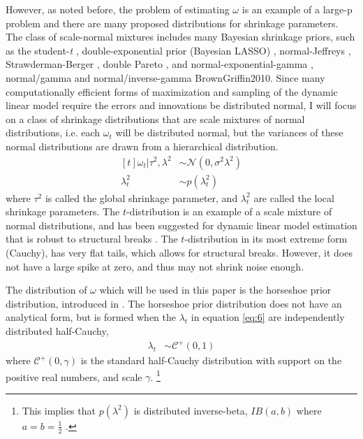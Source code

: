 \documentclass{article}
\newcommand{\paren}[1]{\ensuremath{\left(#1\right)}}
\newcommand{\dnorm}[1]{\ensuremath{\mathcal{N}\paren{#1}}}
\newcommand{\dhalfcauchy}[1]{\ensuremath{\mathcal{C}^{+}\paren{#1}}}
\begin{document}
However, as noted before, the problem of estimating $\omega$ is an example of a large-p problem and there are many proposed distributions for shrinkage parameters.
The class of scale-normal mixtures includes many Bayesian shrinkage priors, such as the student-\textit{t} \parencite{Tipping2001}, double-exponential prior (Bayesian LASSO) \parencites{LiGoel2006}{ParkCasella2008}{Hans2009}, normal-Jeffreys \parencites{FigueiredoMember2003}{BaeMallick2004}, Strawderman-Berger \parencites{Strawderman1971}{Berger1980}, double Pareto \parencite{ArmaganDunsonLee2011},  and normal-exponential-gamma \parencite{BrownGriffin2005}, normal/gamma and normal/inverse-gamma \parencite{CaronDoucet2008}{BrownGriffin2010}.
Since many computationally efficient forms of maximization and sampling of the dynamic linear model require the errors and innovations be distributed normal, I will focus on a class of shrinkage distributions that are scale mixtures of normal distributions, i.e. each $\omega_{t}$ will be distributed normal, but the variances of these normal distributions are drawn from a hierarchical distribution.
\begin{equation}
  \label{eq:6}
  \begin{aligned}[t]
    \omega_{t} | \tau^{2}, \lambda^{2} & \sim \dnorm{0, \sigma^{2} \lambda^{2}} \\
    \lambda_{t}^{2} & \sim p(\lambda^{2}_{t})
  \end{aligned}
\end{equation}
where $\tau^{2}$ is called the global shrinkage parameter, and $\lambda_{t}^{2}$ are called the local shrinkage parameters.
The $t$-distribution is an example of a scale mixture of normal distributions, and has been suggested for dynamic linear model estimation that is robust to structural breaks \parencites{HarveyKoopman2000}{PetrisPetroneEtAl2009}.
The $t$-distribution in its most extreme form (Cauchy), has very flat tails, which allows for structural breaks.
However, it does not have a large spike at zero, and thus may not shrink noise enough.

The distribution of $\omega$ which will be used in this paper is the horseshoe prior distribution, introduced in \textcites{CarvalhoPolsonScott2009}{CarvalhoPolsonScott2010}.
The horseshoe prior distribution does not have an analytical form, but is formed when the $\lambda_{t}$ in equation \eqref{eq:6} are independently distributed half-Cauchy,
\begin{align}
  \label{eq:13}
  \lambda_{t} &\sim \dhalfcauchy{0, 1}
\end{align}
where $\dhalfcauchy{0, \gamma}$ is the standard half-Cauchy distribution with support on the positive real numbers, and scale $\gamma$.%
\footnote{
  This implies that $p(\lambda^{2})$ is distributed inverse-beta, $IB(a, b)$ where $a = b = \frac{1}{2}$ \parencite[4]{PolsonScott2010}. 
}
\end{document}
